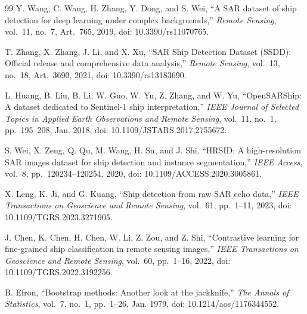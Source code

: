 \documentclass[journal]{IEEEtran}
\begin{document}
\begin{thebibliography}{99}
Y. Wang, C. Wang, H. Zhang, Y. Dong, and S. Wei, ``A SAR dataset of ship detection for deep learning under complex backgrounds,'' \emph{Remote Sensing}, vol.~11, no.~7, Art.~765, 2019, doi: 10.3390/rs11070765.

T. Zhang, X. Zhang, J. Li, and X. Xu, ``SAR Ship Detection Dataset (SSDD): Official release and comprehensive data analysis,'' \emph{Remote Sensing}, vol.~13, no.~18, Art.~3690, 2021, doi: 10.3390/rs13183690.

L. Huang, B. Liu, B. Li, W. Guo, W. Yu, Z. Zhang, and W. Yu, ``OpenSARShip: A dataset dedicated to Sentinel-1 ship interpretation,'' \emph{IEEE Journal of Selected Topics in Applied Earth Observations and Remote Sensing}, vol.~11, no.~1, pp.~195--208, Jan. 2018, doi: 10.1109/JSTARS.2017.2755672.

S. Wei, X. Zeng, Q. Qu, M. Wang, H. Su, and J. Shi, ``HRSID: A high-resolution SAR images dataset for ship detection and instance segmentation,'' \emph{IEEE Access}, vol.~8, pp.~120234--120254, 2020, doi: 10.1109/ACCESS.2020.3005861.

X. Leng, K. Ji, and G. Kuang, ``Ship detection from raw SAR echo data,'' \emph{IEEE Transactions on Geoscience and Remote Sensing}, vol.~61, pp.~1--11, 2023, doi: 10.1109/TGRS.2023.3271905.

J. Chen, K. Chen, H. Chen, W. Li, Z. Zou, and Z. Shi, ``Contrastive learning for fine-grained ship classification in remote sensing images,'' \emph{IEEE Transactions on Geoscience and Remote Sensing}, vol.~60, pp.~1--16, 2022, doi: 10.1109/TGRS.2022.3192256.

B. Efron, ``Bootstrap methods: Another look at the jackknife,'' \emph{The Annals of Statistics}, vol.~7, no.~1, pp.~1--26, Jan. 1979, doi: 10.1214/aos/1176344552.

\end{thebibliography}
\end{document}
